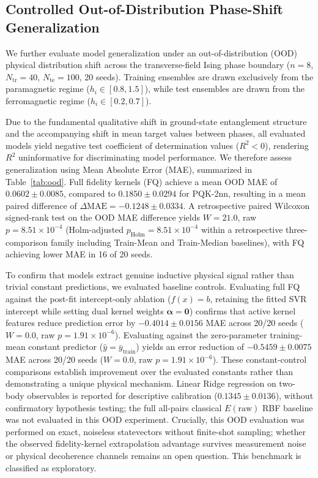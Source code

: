 \documentclass[conference]{IEEEtran}
\begin{document}


\subsection{Controlled Out-of-Distribution Phase-Shift Generalization}
\label{sec:ood}
We further evaluate model generalization under an out-of-distribution (OOD) physical distribution shift across the transverse-field Ising phase boundary ($n=8$, $N_{\mathrm{tr}}=40$, $N_{\mathrm{te}}=100$, 20 seeds). Training ensembles are drawn exclusively from the paramagnetic regime ($h_i \in [0.8, 1.5]$), while test ensembles are drawn from the ferromagnetic regime ($h_i \in [0.2, 0.7]$).

Due to the fundamental qualitative shift in ground-state entanglement structure and the accompanying shift in mean target values between phases, all evaluated models yield negative test coefficient of determination values ($R^2 < 0$), rendering $R^2$ uninformative for discriminating model performance. We therefore assess generalization using Mean Absolute Error (MAE), summarized in Table~\ref{tab:ood}. Full fidelity kernels (FQ) achieve a mean OOD MAE of $0.0602 \pm 0.0085$, compared to $0.1850 \pm 0.0294$ for PQK-2nn, resulting in a mean paired difference of $\Delta\mathrm{MAE} = -0.1248 \pm 0.0334$. A retrospective paired Wilcoxon signed-rank test on the OOD MAE difference yields $W=21.0$, raw $p=8.51\times 10^{-4}$ (Holm-adjusted $p_{\mathrm{Holm}}=8.51\times 10^{-4}$ within a retrospective three-comparison family including Train-Mean and Train-Median baselines), with FQ achieving lower MAE in 16 of 20 seeds.

To confirm that models extract genuine inductive physical signal rather than trivial constant predictions, we evaluated baseline controls. Evaluating full FQ against the post-fit intercept-only ablation ($f(x) = b$, retaining the fitted SVR intercept while setting dual kernel weights $\boldsymbol{\alpha} = \mathbf{0}$) confirms that active kernel features reduce prediction error by $-0.4014 \pm 0.0156$ MAE across 20/20 seeds ($W=0.0$, raw $p=1.91\times 10^{-6}$). Evaluating against the zero-parameter training-mean constant predictor ($\hat{y} = \bar{y}_{\mathrm{train}}$) yields an error reduction of $-0.5459 \pm 0.0075$ MAE across 20/20 seeds ($W=0.0$, raw $p=1.91\times 10^{-6}$). These constant-control comparisons establish improvement over the evaluated constants rather than demonstrating a unique physical mechanism. Linear Ridge regression on two-body observables is reported for descriptive calibration ($0.1345 \pm 0.0136$), without confirmatory hypothesis testing; the full all-pairs classical $E(\text{raw})$ RBF baseline was not evaluated in this OOD experiment. Crucially, this OOD evaluation was performed on exact, noiseless statevectors without finite-shot sampling; whether the observed fidelity-kernel extrapolation advantage survives measurement noise or physical decoherence channels remains an open question. This benchmark is classified as exploratory.
\end{document}
